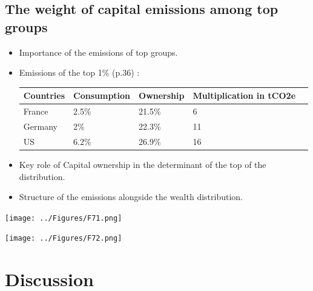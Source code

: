 \documentclass[10pt]{beamer}
\begin{document}
\subsection{The weight of capital emissions among top groups}

\begin{frame}{\subsecname}
    \begin{itemize}
        \item Importance of the emissions of top groups.
        \item Emissions of the top 1\% (p.36) :
        \begin{table}[!ht]
            \centering
            \begin{tabular}{|l|l|l|l|l|}
            \hline
                Countries & Consumption & Ownership & Multiplication in tCO2e \\ \hline
                France & 2.5\% & 21.5\% & 6 \\ \hline
                Germany & 2\% & 22.3\% & 11 \\ \hline
                US & 6.2\% & 26.9\% & 16 \\ \hline
            \end{tabular}
        \end{table}
        \item Key role of Capital ownership in the determinant of the top of the distribution.
        \item Structure of the emissions alongside the wealth distribution.
    \end{itemize}
\end{frame}

\begin{frame}{\subsecname}
    \begin{center}
        \texttt{[image: ../Figures/F71.png]}
    \end{center}
\end{frame}

\begin{frame}{\subsecname}
    \begin{center}
        \texttt{[image: ../Figures/F72.png]}
    \end{center}
\end{frame}

\section{Discussion}

\begin{frame}{\secname}
    \tableofcontents[currentsection, hideothersubsections, sections=\value{section}]
\end{frame}
\end{document}
